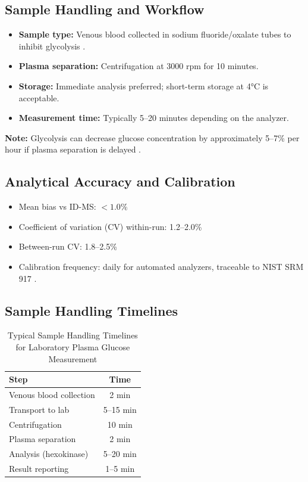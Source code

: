 \documentclass[12pt,a4paper]{article}  %
\begin{document}
\subsection{Sample Handling and Workflow}
\FloatBarrier
\begin{itemize}
    \item \textbf{Sample type:} Venous blood collected in sodium fluoride/oxalate tubes to inhibit glycolysis \cite{NCBI2023}.
    \item \textbf{Plasma separation:} Centrifugation at 3000 rpm for 10 minutes.
    \item \textbf{Storage:} Immediate analysis preferred; short-term storage at 4°C is acceptable.
    \item \textbf{Measurement time:} Typically 5--20 minutes depending on the analyzer.
\end{itemize}
\FloatBarrier
\textbf{Note:} Glycolysis can decrease glucose concentration by approximately 5--7\% per hour if plasma separation is delayed \cite{NCBI2023}.

\subsection{Analytical Accuracy and Calibration}
\begin{itemize}
    \item Mean bias vs ID-MS: $<1.0\%$  
    \item Coefficient of variation (CV) within-run: 1.2--2.0\%  
    \item Between-run CV: 1.8--2.5\%  
    \item Calibration frequency: daily for automated analyzers, traceable to NIST SRM 917 \cite{Sacks2011}.
\end{itemize}

\subsection{Sample Handling Timelines}
\FloatBarrier
\begin{table}[h!]
\centering
\caption{Typical Sample Handling Timelines for Laboratory Plasma Glucose Measurement}
\begin{tabular}{l c}
\hline
\textbf{Step} & \textbf{Time} \\
\hline
Venous blood collection & 2 min \\
Transport to lab & 5--15 min \\
Centrifugation & 10 min \\
Plasma separation & 2 min \\
Analysis (hexokinase) & 5--20 min \\
Result reporting & 1--5 min \\
\hline
\end{tabular}
\label{tab:timing}
\end{table}
\FloatBarrier
\end{document}
